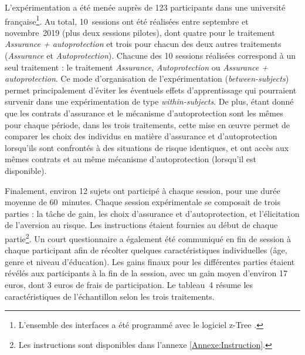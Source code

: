 \begin{Article}
\begin{refsection}[Mouminoux]
L'expérimentation a été menée auprès de 123 participants dans une université française\footnote{L'ensemble des interfaces a été programmé avec le logiciel z-Tree \parencite{fbs21}.}. Au total, 10~sessions ont été réalisées entre septembre et novembre~2019 (plus deux sessions pilotes), dont quatre pour le traitement \textit{Assurance + autoprotection} et trois pour chacun des deux autres traitements (\textit{Assurance} et \textit{Autoprotection}). Chacune des 10 sessions réalisées correspond à un seul traitement : le traitement \textit{Assurance}, \textit{Autoprotection} ou \textit{Assurance + autoprotection}. Ce mode d'organisation de l'expérimentation (\textit{between-subjects}) permet principalement d'éviter les éventuels effets d'apprentissage qui pourraient survenir dans une expérimentation de type \textit{within-subjects}. De plus, étant donné que les contrats d'assurance et le mécanisme d'autoprotection sont les mêmes pour chaque période, dans les trois traitements, cette mise en \oe uvre permet de comparer les choix des individus en matière d'assurance et d'autoprotection lorsqu'ils sont confrontés à des situations de risque identiques, et ont accès aux mêmes contrats et au même mécanisme d'autoprotection (lorsqu'il est disponible).

Finalement, environ 12 sujets ont participé à chaque session, pour une durée moyenne de 60~minutes. Chaque session expérimentale se composait de trois parties : la tâche de gain, les choix d'assurance et d'autoprotection, et l'élicitation de l'aversion au risque. Les instructions étaient fournies au début de chaque partie\footnote{Les instructions sont disponibles dans l'annexe \ref{Annexe:Instruction}.}. Un court questionnaire a également été communiqué en fin de session à chaque participant afin de récolter quelques caractéristiques individuelles (âge, genre et niveau d'éducation). Les gains finaux pour les différentes parties étaient révélés aux participants à la fin de la session, avec un gain moyen d’environ 17 euros, dont 3 euros de frais de participation. Le tableau~4 résume les caractéristiques de l'échantillon selon les trois traitements.



\end{refsection}
\end{Article}
